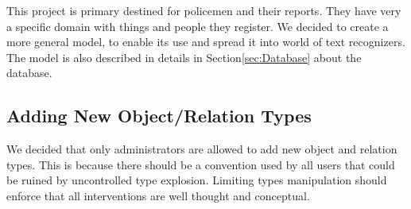 This project is primary destined for policemen and their reports. They have very
a specific domain with things and people they register. We decided to create
a more general model, to enable its use and spread it into world of text
recognizers. The model is also described in details in Section\ref{sec:Database}
about the database.

\subsection{Adding New Object/Relation Types}
\label{ssec:AddingTypes}

We decided that only administrators are allowed to add new object and relation
types. This is because there should be a convention used by all users that could
be ruined by uncontrolled type explosion. Limiting types manipulation should
enforce that all interventions are well thought and conceptual.
